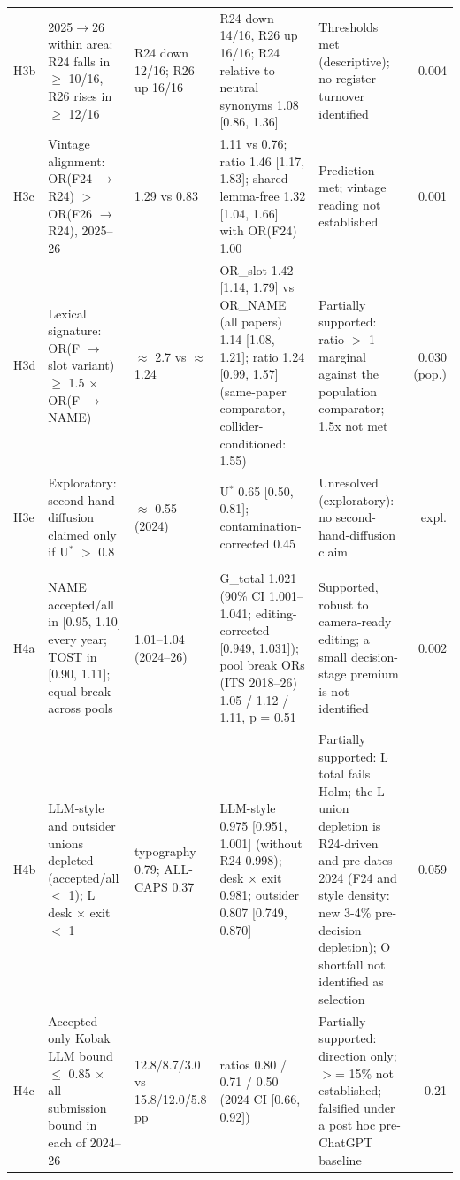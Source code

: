 {\begin{longtable}{l p{2.5cm} p{2.2cm} p{3.9cm} p{3.2cm} r}
H3b & 2025$\rightarrow$26 within area: R24 falls in $\geq$ 10/16, R26 rises in $\geq$ 12/16 & R24 down 12/16; R26 up 16/16 & R24 down 14/16, R26 up 16/16; R24 relative to neutral synonyms 1.08 [0.86, 1.36] & Thresholds met (descriptive); no register turnover identified & 0.004 \\
H3c & Vintage alignment: OR(F24 $\rightarrow$ R24) $>$ OR(F26 $\rightarrow$ R24), 2025--26 & 1.29 vs 0.83 & 1.11 vs 0.76; ratio 1.46 [1.17, 1.83]; shared-lemma-free 1.32 [1.04, 1.66] with OR(F24) 1.00 & Prediction met; vintage reading not established & 0.001 \\
H3d & Lexical signature: OR(F $\rightarrow$ slot variant) $\geq$ 1.5 $\times$ OR(F $\rightarrow$ NAME) & $\approx$ 2.7 vs $\approx$ 1.24 & OR\_slot 1.42 [1.14, 1.79] vs OR\_NAME (all papers) 1.14 [1.08, 1.21]; ratio 1.24 [0.99, 1.57] (same-paper comparator, collider-conditioned: 1.55) & Partially supported: ratio $>$ 1 marginal against the population comparator; 1.5x not met & 0.030 (pop.) \\
H3e & Exploratory: second-hand diffusion claimed only if U$^{*}$ $>$ 0.8 & $\approx$ 0.55 (2024) & U$^{*}$ 0.65 [0.50, 0.81]; contamination-corrected 0.45 & Unresolved (exploratory): no second-hand-diffusion claim & expl. \\
\addlinespace
\multicolumn{6}{l}{\textit{D4 The gatekeeper (2024--26 pooled)}} \\
H4a & NAME accepted/all in [0.95, 1.10] every year; TOST in [0.90, 1.11]; equal break across pools & 1.01--1.04 (2024--26) & G\_total 1.021 (90\% CI 1.001--1.041; editing-corrected [0.949, 1.031]); pool break ORs (ITS 2018--26) 1.05 / 1.12 / 1.11, p = 0.51 & Supported, robust to camera-ready editing; a small decision-stage premium is not identified & 0.002 \\
H4b & LLM-style and outsider unions depleted (accepted/all $<$ 1); L desk $\times$ exit $<$ 1 & typography 0.79; ALL-CAPS 0.37 & LLM-style 0.975 [0.951, 1.001] (without R24 0.998); desk $\times$ exit 0.981; outsider 0.807 [0.749, 0.870] & Partially supported: L total fails Holm; the L-union depletion is R24-driven and pre-dates 2024 (F24 and style density: new 3-4\% pre-decision depletion); O shortfall not identified as selection & 0.059 \\
H4c & Accepted-only Kobak LLM bound $\leq$ 0.85 $\times$ all-submission bound in each of 2024--26 & 12.8/8.7/3.0 vs 15.8/12.0/5.8 pp & ratios 0.80 / 0.71 / 0.50 (2024 CI [0.66, 0.92]) & Partially supported: direction only; $>$= 15\% not established; falsified under a post hoc pre-ChatGPT baseline & 0.21 \\

\end{longtable}}
